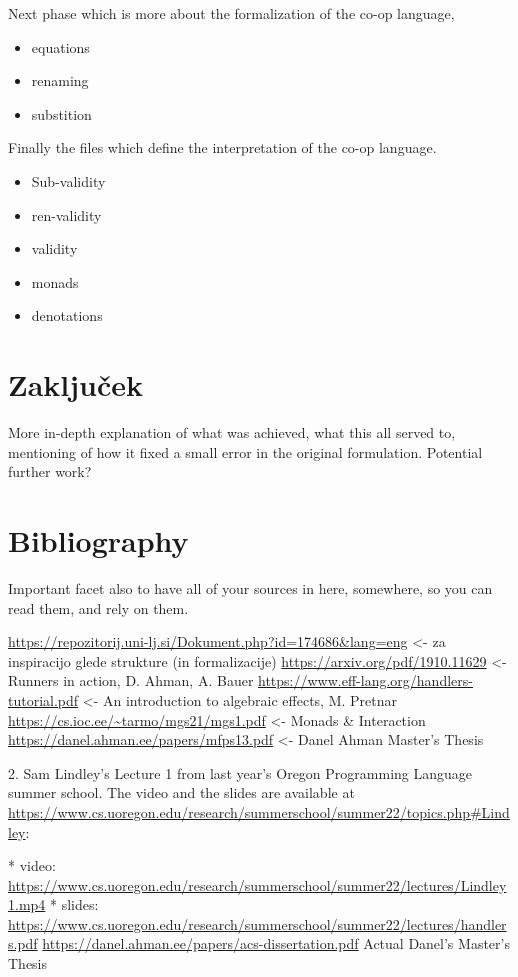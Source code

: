 \documentclass[11pt]{article} %
\begin{document}
Next phase which is more about the formalization of the co-op language,
\begin{itemize}
	\item equations
	\item renaming
	\item substition
\end{itemize}
Finally the files which define the interpretation of the co-op language.
\begin{itemize}
	\item Sub-validity
	\item ren-validity
	\item validity
	\item monads
	\item denotations
\end{itemize}


\section{Zaključek}
More in-depth explanation of what was achieved, what this all served to, mentioning of how it fixed a small error in the original formulation. Potential further work?


\section{Bibliography}
Important facet also to have all of your sources in here, somewhere, so you can read them, and rely on them. 

\url{https://repozitorij.uni-lj.si/Dokument.php?id=174686&lang=eng} <- za inspiracijo glede strukture (in formalizacije)
\url{https://arxiv.org/pdf/1910.11629} <- Runners in action, D. Ahman, A. Bauer
\url{https://www.eff-lang.org/handlers-tutorial.pdf} <- An introduction to algebraic effects, M. Pretnar
\url{https://cs.ioc.ee/~tarmo/mgs21/mgs1.pdf} <- Monads \& Interaction
\url{https://danel.ahman.ee/papers/mfps13.pdf} <- Danel Ahman Master's Thesis

2. Sam Lindley’s Lecture 1 from last year’s Oregon Programming Language summer school. The video and the slides are available at \url{https://www.cs.uoregon.edu/research/summerschool/summer22/topics.php#Lindley}:

   * video: \url{https://www.cs.uoregon.edu/research/summerschool/summer22/lectures/Lindley1.mp4}
   * slides: \url{https://www.cs.uoregon.edu/research/summerschool/summer22/lectures/handlers.pdf}
\url{https://danel.ahman.ee/papers/acs-dissertation.pdf} Actual Danel's Master's Thesis
\end{document}
